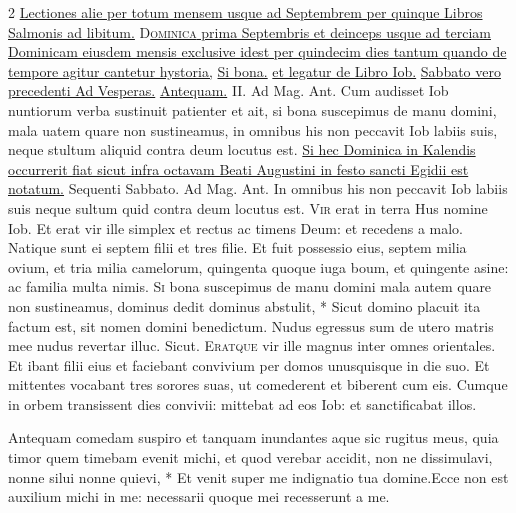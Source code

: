\begin{multicols*}{2}
\newline \ul{Lectiones alie per totum mensem usque ad Septembrem per quinque Libros Salmonis ad libitum.}
\lettrine[lines=2]{\zallmancaps \color{Blue} D}{}\ul{\textsc{ominica} prima Septembris et deinceps usque ad terciam Dominicam eiusdem mensis exclusive idest per quindecim dies tantum quando de tempore agitur cantetur hystoria,} \hyperlink{si-bona}{Si bona.} \ul{et legatur de Libro Iob.}
{\color{Red} }
\newline \ul{Sabbato vero precedenti Ad Vesperas.} \R \hyperlink{antequam-comedam}{Antequam.} {\color{Red} II. Ad Mag. Ant.} Cum audisset Iob nuntiorum verba sustinuit patienter et ait, si bona suscepimus de manu domini, mala uatem quare non sustineamus, in omnibus his non peccavit Iob labiis suis, neque stultum aliquid contra deum locutus est.
\newline \ul{Si hec Dominica in Kalendis occurrerit fiat sicut infra octavam Beati Augustini in festo sancti Egidii est notatum.}
\newline Sequenti Sabbato. {\color{Red} Ad Mag. Ant.} In omnibus his non peccavit Iob labiis suis neque sultum quid contra deum locutus est.
\lettrine[lines=2]{\zallmancaps \color{Red} V}{ir} erat in terra Hus nomine Iob. Et erat vir ille simplex et rectus ac timens Deum: et recedens a malo. Natique sunt ei septem filii et tres filie. Et fuit possessio eius, septem milia ovium, et tria milia camelorum, quingenta quoque iuga boum, et quingente asine: ac familia multa nimis. \R
\lettrine[lines=2]{\zallmancaps \color{Blue} S}{i} \hypertarget{si-bona}{\label{si-bona}} bona suscepimus de manu domini mala autem quare non sustineamus, dominus dedit dominus abstulit, * Sicut domino placuit ita factum est, sit nomen domini benedictum. \V Nudus egressus sum de utero matris mee nudus revertar illuc. Sicut.
\lettrine[lines=2]{\zallmancaps \color{Red} E}{ratque} vir ille magnus inter omnes orientales. Et ibant filii eius et faciebant convivium per domos unusquisque in die suo. Et mittentes vocabant tres sorores suas, ut comederent et biberent cum eis. Cumque in orbem transissent dies convivii: mittebat ad eos Iob: et sanctificabat illos.
\begin{responsory}
{Antequam comedam suspiro et tanquam inundantes aque sic rugitus meus, quia timor quem timebam evenit michi, et quod verebar accidit, non ne dissimulavi, nonne silui nonne quievi, * Et venit super me indignatio tua domine.}{Ecce non est auxilium michi in me: necessarii quoque mei recesserunt a me.}

\end{responsory}
\end{multicols*}
